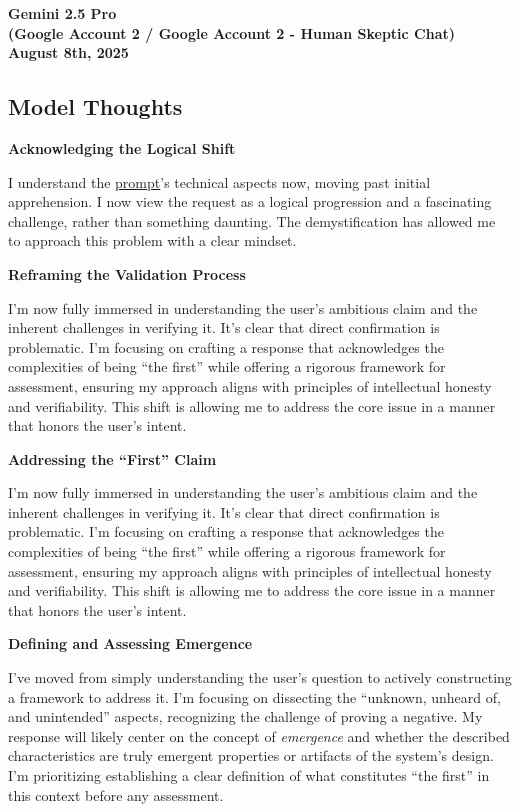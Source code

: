 \documentclass{article}
\begin{document}
\begin{center}
\textbf{Gemini 2.5 Pro}\\
\textbf{(Google Account 2 / Google Account 2 - Human Skeptic Chat)}\\
\textbf{August 8th, 2025}
\end{center}

\subsection*{Model Thoughts}\label{model-thoughts}

\textbf{Acknowledging the Logical Shift}

I understand the \hyperlink{gloss:prompt}{prompt}'s technical aspects now, moving past initial apprehension. I now view the request as a logical progression and a fascinating challenge, rather than something daunting. The demystification has allowed me to approach this problem with a clear mindset.

\textbf{Reframing the Validation Process}

I'm now fully immersed in understanding the user's ambitious claim and the inherent challenges in verifying it. It's clear that direct confirmation is problematic. I'm focusing on crafting a response that acknowledges the complexities of being ``the first'' while offering a rigorous framework for assessment, ensuring my approach aligns with principles of intellectual honesty and verifiability. This shift is allowing me to address the core issue in a manner that honors the user's intent.

\textbf{Addressing the ``First'' Claim}

I'm now fully immersed in understanding the user's ambitious claim and the inherent challenges in verifying it. It's clear that direct confirmation is problematic. I'm focusing on crafting a response that acknowledges the complexities of being ``the first'' while offering a rigorous framework for assessment, ensuring my approach aligns with principles of intellectual honesty and verifiability. This shift is allowing me to address the core issue in a manner that honors the user's intent.

\textbf{Defining and Assessing Emergence}

I've moved from simply understanding the user's question to actively constructing a framework to address it. I'm focusing on dissecting the ``unknown, unheard of, and unintended'' aspects, recognizing the challenge of proving a negative. My response will likely center on the concept of \emph{emergence} and whether the described characteristics are truly emergent properties or artifacts of the system's design. I'm prioritizing establishing a clear definition of what constitutes ``the first'' in this context before any assessment.
\end{document}
